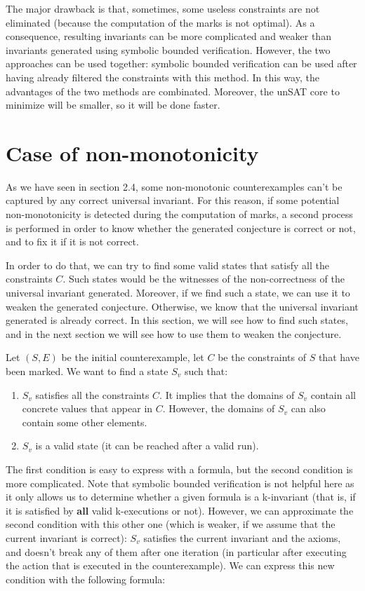 \documentclass[11pt,a4paper,oldfontcommands,openany]{memoir}
\begin{document}
    The major drawback is that, sometimes, some useless constraints are not eliminated (because the computation of the marks is not optimal).
    As a consequence, resulting invariants can be more complicated and weaker than invariants generated using symbolic bounded verification.
    However, the two approaches can be used together: symbolic bounded verification can be used after having already filtered the constraints with this method.
    In this way, the advantages of the two methods are combinated. Moreover, the unSAT core to minimize will be smaller, so it will be done faster.

    \section{Case of non-monotonicity}

    As we have seen in section 2.4, some non-monotonic counterexamples can't be captured by any correct universal invariant.
    For this reason, if some potential non-monotonicity is detected during the computation of marks,
    a second process is performed in order to know whether the generated conjecture is correct or not, and to fix it if it is not correct.
    
    In order to do that, we can try to find some valid states that satisfy all the constraints \(C\).
    Such states would be the witnesses of the non-correctness of the universal invariant generated.
    Moreover, if we find such a state, we can use it to weaken the generated conjecture.
    Otherwise, we know that the universal invariant generated is already correct.
    In this section, we will see how to find such states, and in the next section we will see how to use them to weaken the conjecture.

    Let \((S,E)\) be the initial counterexample, let \(C\) be the constraints of \(S\) that have been marked.
    We want to find a state \(S_v\) such that:
    \begin{enumerate}
        \item \(S_v\) satisfies all the constraints \(C\). It implies that the domains of \(S_v\) contain all concrete values that appear in \(C\).
        However, the domains of \(S_v\) can also contain some other elements.
        \item \(S_v\) is a valid state (it can be reached after a valid run).
    \end{enumerate}

    The first condition is easy to express with a formula, but the second condition is more complicated.
    Note that symbolic bounded verification is not helpful here as it only allows us to determine whether a given formula is a k-invariant (that is, if it is satisfied by \textbf{all} valid k-executions or not).
    However, we can approximate the second condition with this other one (which is weaker, if we assume that the current invariant is correct):
    \(S_v\) satisfies the current invariant and the axioms, and doesn't break any of them after one iteration (in particular after executing the action that is executed in the counterexample).
    We can express this new condition with the following formula:
\end{document}
